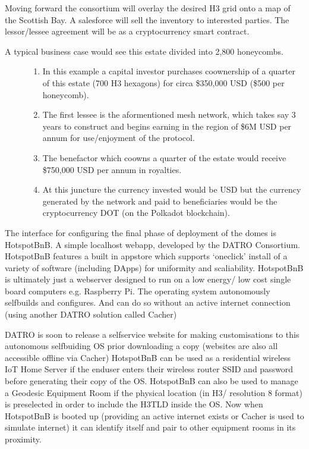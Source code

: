 \documentclass[letterpaper,10pt,openany,oneside,english]{sphinxmanual}
\begin{document}
\sphinxAtStartPar
Moving forward the consortium will overlay the desired H3 grid onto a map of the Scottish Bay.
A salesforce will sell the inventory to interested parties.
The lessor/lessee agreement will be as a cryptocurrency smart contract.
\begin{description}
\item[{A typical business case would see this estate divided into 2,800 honeycombs.}] \leavevmode\begin{enumerate}
%
\item {} 
\sphinxAtStartPar
In this example a capital investor purchases co\sphinxhyphen{}ownership of a quarter of this estate (700 H3 hexagons) for circa \$350,000 USD (\$500 per honeycomb).

\item {} 
\sphinxAtStartPar
The first lessee is the aformentioned mesh network, which takes say 3 years to construct and begins earning in the region of \$6M USD per annum for use/enjoyment of the protocol.

\item {} 
\sphinxAtStartPar
The benefactor which co\sphinxhyphen{}owns a quarter of the estate would receive \$750,000 USD per annum in royalties.

\item {} 
\sphinxAtStartPar
At this juncture the currency invested would be USD but the currency generated by the network and paid to beneficiaries would be the cryptocurrency DOT (on the Polkadot blockchain).

\end{enumerate}

\end{description}

\sphinxAtStartPar
The interface for configuring the final phase of deployment of the domes is HotspotBnB. A simple localhost webapp, developed by the DATRO Consortium.
HotspotBnB features a built in appstore which supports ‘one\sphinxhyphen{}click’ install of a variety of software (including DApps) for uniformity and scaliability.
HotspotBnB is ultimately just a webserver designed to run on a low energy/ low cost single board computers e.g. Raspberry Pi.
The operating system autonomously self\sphinxhyphen{}builds and configures. And can do so without an active internet connection (using another DATRO solution called Cacher)

\sphinxAtStartPar
DATRO is soon to release a self\sphinxhyphen{}service website for making customisations to this autonomous self\sphinxhyphen{}buiding OS prior downloading a copy (websites are also all accessible offline via Cacher)
HotspotBnB can be used as a residential wireless IoT Home Server if the end\sphinxhyphen{}user enters their wireless router SSID and password before generating their copy of the OS.
HotspotBnB can also be used to manage a Geodesic Equipment Room if the physical location (in H3/ resolution 8 format) is pre\sphinxhyphen{}selected in order to include the H3\sphinxhyphen{}TLD inside the OS.
Now when HotspotBnB is booted up (providing an active internet exists or Cacher is used to simulate internet) it can identify itself and pair to other equipment rooms in its proximity.
\end{document}

